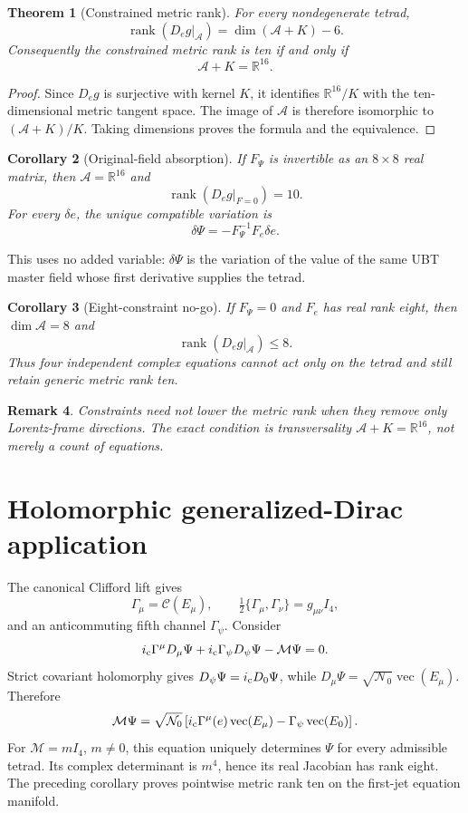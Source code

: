 \documentclass[11pt,a4paper]{article}
\newtheorem{theorem}{Theorem}
\newtheorem{corollary}[theorem]{Corollary}
\newtheorem{remark}[theorem]{Remark}
\begin{document}
\begin{theorem}[Constrained metric rank]
For every nondegenerate tetrad,
\[
 \boxed{
 \operatorname{rank}(D_eg|_{\mathcal A})
 =\dim(\mathcal A+K)-6.}
\]
Consequently the constrained metric rank is ten if and only if
\[
 \boxed{\mathcal A+K=\mathbb R^{16}.}
\]
\end{theorem}

\begin{proof}
Since $D_eg$ is surjective with kernel $K$, it identifies
$\mathbb R^{16}/K$ with the ten-dimensional metric tangent space.  The image
of $\mathcal A$ is therefore isomorphic to $(\mathcal A+K)/K$.  Taking
dimensions proves the formula and the equivalence.
\end{proof}

\begin{corollary}[Original-field absorption]
If $F_\Psi$ is invertible as an $8\times8$ real matrix, then
$\mathcal A=\mathbb R^{16}$ and
\[
 \operatorname{rank}(D_eg|_{F=0})=10.
\]
For every $\delta e$, the unique compatible variation is
\[
 \delta\Psi=-F_\Psi^{-1}F_e\delta e.
\]
\end{corollary}

This uses no added variable: $\delta\Psi$ is the variation of the value of the
same UBT master field whose first derivative supplies the tetrad.

\begin{corollary}[Eight-constraint no-go]
If $F_\Psi=0$ and $F_e$ has real rank eight, then
$\dim\mathcal A=8$ and
\[
 \operatorname{rank}(D_eg|_{\mathcal A})\le8.
\]
Thus four independent complex equations cannot act only on the tetrad and
still retain generic metric rank ten.
\end{corollary}

\begin{remark}
Constraints need not lower the metric rank when they remove only Lorentz-frame
directions.  The exact condition is transversality $\mathcal A+K=\mathbb R^{16}$,
not merely a count of equations.
\end{remark}

\section{Holomorphic generalized-Dirac application}
The canonical Clifford lift gives
\[
 \Gamma_\mu=\mathcal C(E_\mu),
 \qquad \tfrac12\{\Gamma_\mu,\Gamma_\nu\}=g_{\mu\nu}I_4,
\]
and an anticommuting fifth channel $\Gamma_\psi$.  Consider
\[
 i_{\rm c}\Gamma^\mu D_\mu\Psi
 +i_{\rm c}\Gamma_\psi D_\psi\Psi
 -\mathcal M\Psi=0.
\]
Strict covariant holomorphy gives $D_\psi\Psi=i_{\rm c}D_0\Psi$, while
$D_\mu\Psi=\sqrt{\mathcal N_0}\operatorname{vec}(E_\mu)$.  Therefore
\[
 \mathcal M\Psi
 =\sqrt{\mathcal N_0}\left[
 i_{\rm c}\Gamma^\mu(e)\operatorname{vec}(E_\mu)
 -\Gamma_\psi\operatorname{vec}(E_0)
 \right].
\]
For $\mathcal M=mI_4$, $m\ne0$, this equation uniquely determines $\Psi$ for
every admissible tetrad.  Its complex determinant is $m^4$, hence its real
Jacobian has rank eight.  The preceding corollary proves pointwise metric rank
ten on the first-jet equation manifold.
\end{document}
